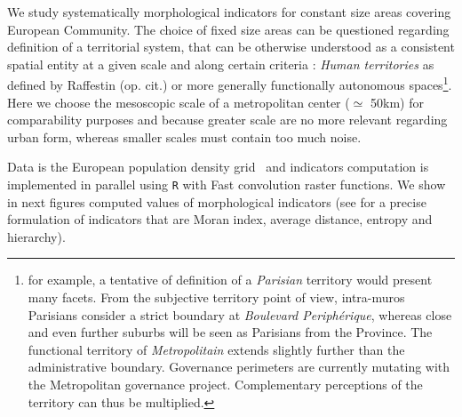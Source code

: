We study systematically morphological indicators for constant size areas covering European Community. The choice of fixed size areas can be questioned regarding definition of a territorial system, that can be otherwise understood as a consistent spatial entity at a given scale and along certain criteria : \emph{Human territories} as defined by Raffestin (op. cit.) or more generally functionally autonomous spaces\footnote{for example, a tentative of definition of a \textit{Parisian} territory would present many facets. From the subjective territory point of view, intra-muros Parisians consider a strict boundary at \textit{Boulevard Periph{\'e}rique}, 
 whereas close and even further suburbs will be seen as Parisians from the Province. The functional territory of \textit{Metropolitain} extends slightly further than the administrative boundary. 
  Governance perimeters are currently mutating with the Metropolitan governance project. Complementary perceptions of the territory can thus be multiplied.}. Here we choose the mesoscopic scale of a metropolitan center ($\simeq$ 50km) for comparability purposes and because greater scale are no more relevant regarding urban form, whereas smaller scales must contain too much noise. 
  

Data is the European population density grid~\cite{eurostat} 
 and indicators computation is implemented in parallel using \texttt{R} with Fast convolution raster functions. We show in next figures computed values of morphological indicators (see \cite{le2015forme} for a precise formulation of indicators that are Moran index, average distance, entropy and hierarchy). 



